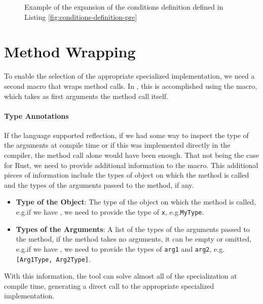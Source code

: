\begin{figure}[htbp!]
	\centering
	\captionsetup{type=listing,skip=2pt}
	\caption{Example of the expansion of the conditions definition defined in Listing \ref{fig:conditions-definition-pre}}
	\label{fig:conditions-definition-post}
\end{figure}


\section{Method Wrapping}\label{sec:method_wrapping}
To enable the selection of the appropriate specialized implementation, we need a second macro that wraps method calls.
In \mytool{}, this is accomplished using the  macro, which takes as first arguments the method call itself.

\paragraph{Type Annotations}
If the language supported reflection, if we had some way to inspect the type of the arguments at compile time or if this was implemented directly in the compiler, the method call alone would have been enough.
That not being the case for Rust, we need to provide additional information to the macro.
This additional pieces of information include the types of object on which the method is called and the types of the arguments passed to the method, if any.
\begin{itemize}
	\item \textbf{Type of the Object}: The type of the object on which the method is called, e.g.\@ if we have , we need to provide the type of \texttt{x}, e.g.\@ \mbox{\texttt{MyType}}.
	\item \textbf{Types of the Arguments}: A list of the types of the arguments passed to the method, if the method takes no arguments, it can be empty or omitted, e.g.\@ if we have , we need to provide the types of \texttt{arg1} and \texttt{arg2}, e.g.\@ \mbox{\texttt{[Arg1Type, Arg2Type]}}.
\end{itemize}
With this information, the tool can solve almost all of the specialization at compile time, generating a direct call to the appropriate specialized implementation.

